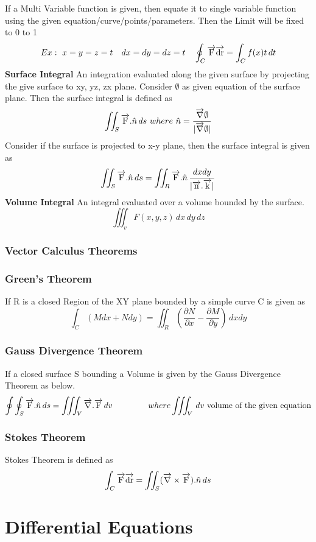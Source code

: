 If a Multi Variable function is given, then equate it to single variable function using the given equation/curve/points/parameters. Then the Limit will be fixed to 0 to 1
\[Ex:\ x=y=z=t\ \ \  dx=dy=dz=t\ \ \ \oint_C\overrightarrow{\rm F}\overrightarrow{\rm dr}=\int_Cf(x)t \,dt \]
\textbf{\large Surface Integral} An integration evaluated along the given surface by projecting the give surface to xy, yz, zx plane.
Consider \(\emptyset\) as given equation of the surface plane. Then the surface integral is defined as
\[\iint_S\overrightarrow{\rm F}.\hat{n}\,ds\ where\ \hat{n}= \frac{\overrightarrow{\rm \nabla}\emptyset}{|\overrightarrow{\rm \nabla}\emptyset|} \]
Consider if the surface is projected to x-y plane, then the surface integral is given as
\[\iint_S\overrightarrow{\rm F}.\hat{n}\,ds=\iint_R\overrightarrow{\rm F}.\hat{n}\,\frac{dxdy}{|\overrightarrow{\rm n}.\overrightarrow{\rm k}|}\]
\textbf{\large Volume Integral} An integral evaluated over a volume bounded by the surface.
\[\iiint_v F(x,y,z) \, dx\, dy\, dz\]
\subsection{Vector Calculus Theorems}
\subsection*{Green's Theorem}
If R is a closed Region of the XY plane bounded by a simple curve C is given as
\[\int_C(Mdx+Ndy)=\iint_R\left(\frac{\partial N}{\partial x}-\frac{\partial M}{\partial y}\right) \,dxdy \]

\subsection*{Gauss Divergence Theorem}
If a closed surface S bounding a Volume is given by the Gauss Divergence Theorem as below.
\[\oint\oint_S\overrightarrow{\rm F}.\hat{n}\,ds=\iiint_V\overrightarrow{\rm \nabla}.\overrightarrow{\rm F} \,dv \ \ \ \ \ \ \ \ \ \ \ \ \  where \iiint_V \,dv \ \text{volume of the given equation}\]

\subsection*{Stokes Theorem}
Stokes Theorem is defined as
\[\int_C\overrightarrow{\rm F}\overrightarrow{\rm dr}=\iint_S(\overrightarrow{\rm \nabla}\times\overrightarrow{\rm F}).\hat{n} \,ds\]


\chapter*{Differential Equations}
